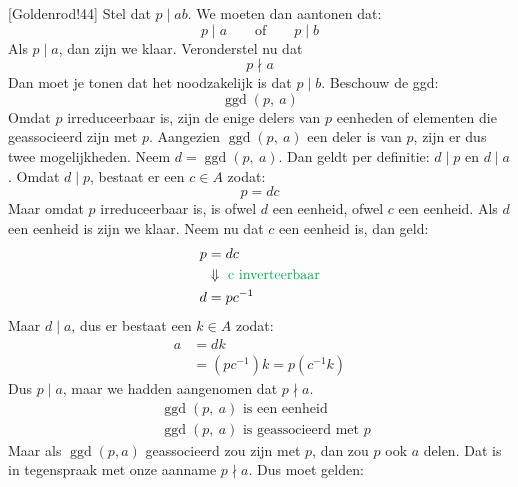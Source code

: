 [Goldenrod!44] Stel dat $p \mid ab$. We moeten dan aantonen dat:
\begin{equation*}
    p \mid a \qquad \text{of} \qquad p \mid b
\end{equation*}
Als $p \mid a$, dan zijn we klaar. Veronderstel nu dat
\begin{equation*}
    p \nmid a
\end{equation*}
Dan moet je tonen dat het noodzakelijk is dat $p \mid b$. Beschouw de ggd:
\begin{equation*}
    \operatorname{ggd}(p,\ a)
\end{equation*}
Omdat $p$ irreduceerbaar is, zijn de enige delers van $p$ eenheden of elementen die geassocieerd zijn met $p$. Aangezien $\operatorname{ggd}(p,\ a)$ een deler is van $p$, zijn er dus twee mogelijkheden. Neem $d = \operatorname{ggd}(p,\ a)$. Dan geldt per definitie: $d \mid p$ en $d \mid a$. Omdat $d \mid p$, bestaat er een $c \in A$ zodat:
\begin{equation*}
    p = dc
\end{equation*}
Maar omdat $p$ irreduceerbaar is, is ofwel $d$ een eenheid, ofwel $c$ een eenheid. Als $d$ een eenheid is zijn we klaar. Neem nu dat $c$ een eenheid is, dan geld:
\begin{equation*}
    \begin{aligned}
        p &= dc \\
        &\Downarrow \textcolor{Green}{\text{ c inverteerbaar}} \\
        d &= pc^{-1} \\
    \end{aligned}
\end{equation*}
Maar $d\mid a$, dus er bestaat een $k \in A$ zodat:
\begin{equation*}
    \begin{aligned}
        a &= dk \\
          &= (pc^{-1})k = p(c^{-1}k)
    \end{aligned}
\end{equation*}
Dus $p \mid a$, maar we hadden aangenomen dat $p \nmid a$.
\begin{equation*}
    \begin{aligned}
        &\operatorname{ggd}(p,\ a) \text{ is een eenheid} \\
        &\operatorname{ggd}(p,\ a) \text{ is geassocieerd met } p
    \end{aligned}
\end{equation*}
Maar als $\operatorname{ggd}(p,a)$ geassocieerd zou zijn met $p$, dan zou $p$ ook $a$ delen. Dat is in tegenspraak met onze aanname $p \nmid a$. Dus moet gelden:
